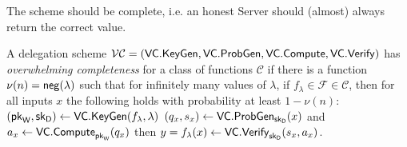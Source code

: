 \begin{definition}
\end{definition}     
   
     

\noindent
The scheme should be complete, i.e. an honest Server should (almost) always return the correct value. 
\begin{definition}[Completeness]
\label{def:vc-completeness}
A delegation scheme ${\cal VC} = (\mathsf{VC.KeyGen},\mathsf{VC.ProbGen},\mathsf{VC.Compute},\mathsf{VC.Verify})$ has \textit{overwhelming completeness} for a class of functions $\mathcal{C}$ if  there is a function $\nu(n) = \mathsf{neg}(\lambda)$ such that for infinitely many values of $\lambda$, if $f_\lambda \in \mathcal{F} \in \mathcal{C}$, then for all 
inputs $x$ 
the following holds with probability at least $1-\nu(n)$:  
  $(\mathsf{pk}_{\mathsf{W}}, \mathsf{sk}_{\mathsf{D}}) \gets \mathsf{VC.KeyGen}(f_\lambda, \lambda)$
$(q_x,s_x) \gets \mathsf{VC.ProbGen}_{\mathsf{sk}_{\mathsf{D}}}(x)$ and 
  $a_x \gets \mathsf{VC.Compute}_{\mathsf{pk}_{\mathsf{W}}}(q_x)$ then $y=f_{\lambda}(x) \gets \mathsf{VC.Verify}_{\mathsf{sk}_{\mathsf{D}}}(s_x,a_x)$.
\end{definition}




